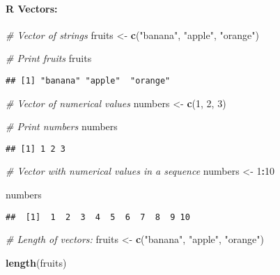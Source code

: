 \documentclass[
]{article}
\newenvironment{Shaded}{\begin{snugshade}}{\end{snugshade}}
\newcommand{\CommentTok}[1]{\textcolor[rgb]{0.56,0.35,0.01}{\textit{#1}}}
\newcommand{\DecValTok}[1]{\textcolor[rgb]{0.00,0.00,0.81}{#1}}
\newcommand{\FunctionTok}[1]{\textcolor[rgb]{0.13,0.29,0.53}{\textbf{#1}}}
\newcommand{\NormalTok}[1]{#1}
\newcommand{\OtherTok}[1]{\textcolor[rgb]{0.56,0.35,0.01}{#1}}
\newcommand{\SpecialCharTok}[1]{\textcolor[rgb]{0.81,0.36,0.00}{\textbf{#1}}}
\newcommand{\StringTok}[1]{\textcolor[rgb]{0.31,0.60,0.02}{#1}}
\begin{document}
\hypertarget{r-vectors}{%
\paragraph{R Vectors:}\label{r-vectors}}

\begin{Shaded}
\begin{Highlighting}[]
\CommentTok{\# Vector of strings}
\NormalTok{fruits }\OtherTok{\textless{}{-}} \FunctionTok{c}\NormalTok{(}\StringTok{"banana"}\NormalTok{, }\StringTok{"apple"}\NormalTok{, }\StringTok{"orange"}\NormalTok{)}

\CommentTok{\# Print fruits}
\NormalTok{fruits}
\end{Highlighting}
\end{Shaded}

\begin{verbatim}
## [1] "banana" "apple"  "orange"
\end{verbatim}

\begin{Shaded}
\begin{Highlighting}[]
\CommentTok{\# Vector of numerical values}
\NormalTok{numbers }\OtherTok{\textless{}{-}} \FunctionTok{c}\NormalTok{(}\DecValTok{1}\NormalTok{, }\DecValTok{2}\NormalTok{, }\DecValTok{3}\NormalTok{)}

\CommentTok{\# Print numbers}
\NormalTok{numbers}
\end{Highlighting}
\end{Shaded}

\begin{verbatim}
## [1] 1 2 3
\end{verbatim}

\begin{Shaded}
\begin{Highlighting}[]
\CommentTok{\# Vector with numerical values in a sequence}
\NormalTok{numbers }\OtherTok{\textless{}{-}} \DecValTok{1}\SpecialCharTok{:}\DecValTok{10}

\NormalTok{numbers}
\end{Highlighting}
\end{Shaded}

\begin{verbatim}
##  [1]  1  2  3  4  5  6  7  8  9 10
\end{verbatim}

\begin{Shaded}
\begin{Highlighting}[]
\CommentTok{\# Length of vectors:}
\NormalTok{fruits }\OtherTok{\textless{}{-}} \FunctionTok{c}\NormalTok{(}\StringTok{"banana"}\NormalTok{, }\StringTok{"apple"}\NormalTok{, }\StringTok{"orange"}\NormalTok{)}

\FunctionTok{length}\NormalTok{(fruits)}
\end{Highlighting}
\end{Shaded}
\end{document}
